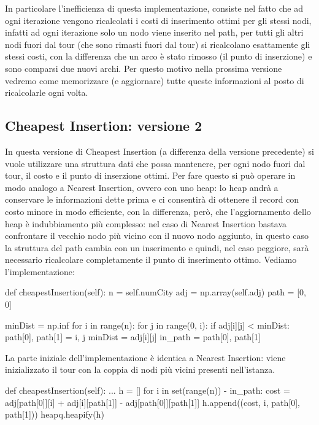 \documentclass[a4paper,12pt]{report}
\begin{document}
In particolare l'inefficienza di questa implementazione, consiste nel fatto che ad ogni iterazione vengono ricalcolati i costi di inserimento ottimi per gli stessi nodi, infatti ad ogni iterazione solo un nodo viene inserito nel path, per tutti gli altri nodi fuori dal tour (che sono rimasti fuori dal tour) si ricalcolano esattamente gli stessi costi, con la differenza che un arco è stato rimosso (il punto di inserzione) e sono comparsi due nuovi archi. Per questo motivo nella prossima versione vedremo come memorizzare (e aggiornare) tutte queste informazioni al posto di ricalcolarle ogni volta.

\subsection{Cheapest Insertion: versione 2}
In questa versione di Cheapest Insertion (a differenza della versione precedente) si vuole utilizzare una struttura dati che possa mantenere, per ogni nodo fuori dal tour, il costo e il punto di inserzione ottimi. Per fare questo si può operare in modo analogo a Nearest Insertion, ovvero con uno heap: lo heap andrà a conservare le informazioni dette prima e ci consentirà di ottenere il record con costo minore in modo efficiente, con la differenza, però, che l'aggiornamento dello heap è indubbiamento più complesso: nel caso di Nearest Insertion bastava confrontare il vecchio nodo più vicino con il nuovo nodo aggiunto, in questo caso la struttura del path cambia con un inserimento e quindi, nel caso peggiore, sarà necessario ricalcolare completamente il punto di inserimento ottimo. Vediamo l'implementazione:
\begin{python}
def cheapestInsertion(self):
  n = self.numCity
  adj = np.array(self.adj)
  path = [0, 0]

  minDist = np.inf
  for i in range(n):
      for j in range(0, i):
          if adj[i][j] < minDist:
              path[0], path[1] = i, j
              minDist = adj[i][j]
  in_path = {path[0], path[1]}
\end{python}
La parte iniziale dell'implementazione è identica a Nearest Insertion: viene inizializzato il tour con la coppia di nodi più vicini presenti nell'istanza.
\begin{python}
def cheapestInsertion(self):
  ...
  h = []
  for i in set(range(n)) - in_path:
    cost = adj[path[0]][i] + adj[i][path[1]] - adj[path[0]][path[1]]
    h.append((cost, i, path[0], path[1]))
  heapq.heapify(h)
\end{python}
\end{document}
